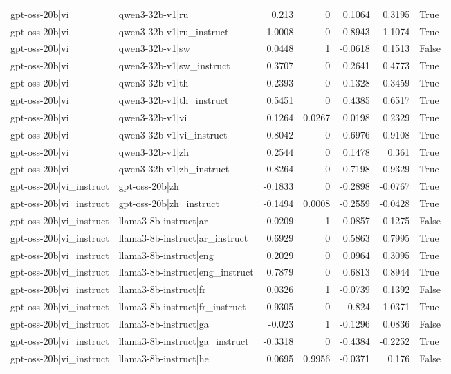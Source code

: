 \begin{table}
\begin{tabular}{l l r r r r l}
gpt-oss-20b|vi & qwen3-32b-v1|ru & 0.213 & 0 & 0.1064 & 0.3195 & True \\
gpt-oss-20b|vi & qwen3-32b-v1|ru_instruct & 1.0008 & 0 & 0.8943 & 1.1074 & True \\
gpt-oss-20b|vi & qwen3-32b-v1|sw & 0.0448 & 1 & -0.0618 & 0.1513 & False \\
gpt-oss-20b|vi & qwen3-32b-v1|sw_instruct & 0.3707 & 0 & 0.2641 & 0.4773 & True \\
gpt-oss-20b|vi & qwen3-32b-v1|th & 0.2393 & 0 & 0.1328 & 0.3459 & True \\
gpt-oss-20b|vi & qwen3-32b-v1|th_instruct & 0.5451 & 0 & 0.4385 & 0.6517 & True \\
gpt-oss-20b|vi & qwen3-32b-v1|vi & 0.1264 & 0.0267 & 0.0198 & 0.2329 & True \\
gpt-oss-20b|vi & qwen3-32b-v1|vi_instruct & 0.8042 & 0 & 0.6976 & 0.9108 & True \\
gpt-oss-20b|vi & qwen3-32b-v1|zh & 0.2544 & 0 & 0.1478 & 0.361 & True \\
gpt-oss-20b|vi & qwen3-32b-v1|zh_instruct & 0.8264 & 0 & 0.7198 & 0.9329 & True \\
gpt-oss-20b|vi_instruct & gpt-oss-20b|zh & -0.1833 & 0 & -0.2898 & -0.0767 & True \\
gpt-oss-20b|vi_instruct & gpt-oss-20b|zh_instruct & -0.1494 & 0.0008 & -0.2559 & -0.0428 & True \\
gpt-oss-20b|vi_instruct & llama3-8b-instruct|ar & 0.0209 & 1 & -0.0857 & 0.1275 & False \\
gpt-oss-20b|vi_instruct & llama3-8b-instruct|ar_instruct & 0.6929 & 0 & 0.5863 & 0.7995 & True \\
gpt-oss-20b|vi_instruct & llama3-8b-instruct|eng & 0.2029 & 0 & 0.0964 & 0.3095 & True \\
gpt-oss-20b|vi_instruct & llama3-8b-instruct|eng_instruct & 0.7879 & 0 & 0.6813 & 0.8944 & True \\
gpt-oss-20b|vi_instruct & llama3-8b-instruct|fr & 0.0326 & 1 & -0.0739 & 0.1392 & False \\
gpt-oss-20b|vi_instruct & llama3-8b-instruct|fr_instruct & 0.9305 & 0 & 0.824 & 1.0371 & True \\
gpt-oss-20b|vi_instruct & llama3-8b-instruct|ga & -0.023 & 1 & -0.1296 & 0.0836 & False \\
gpt-oss-20b|vi_instruct & llama3-8b-instruct|ga_instruct & -0.3318 & 0 & -0.4384 & -0.2252 & True \\
gpt-oss-20b|vi_instruct & llama3-8b-instruct|he & 0.0695 & 0.9956 & -0.0371 & 0.176 & False \\

\end{tabular}
\end{table}
